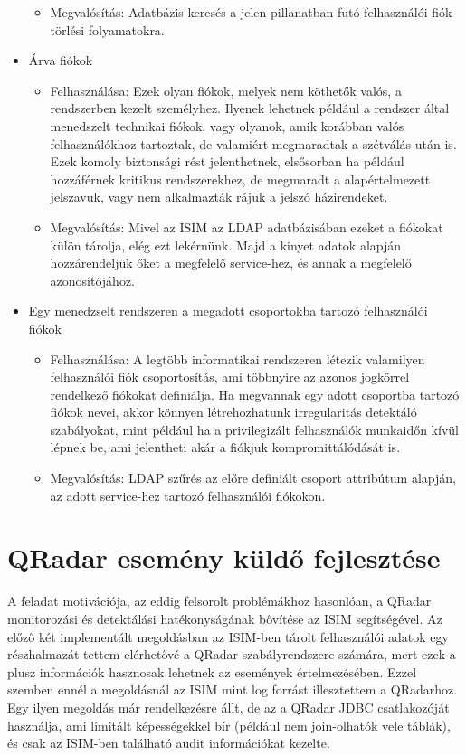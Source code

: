 \begin{itemize}
\begin{itemize}
		\item Megvalósítás:  Adatbázis keresés a jelen pillanatban futó felhasználói fiók törlési folyamatokra.
	\end{itemize}
	\item Árva fiókok
	\begin{itemize}
		\small
		\item Felhasználása: Ezek olyan fiókok, melyek nem köthetők valós, a rendszerben kezelt személyhez. Ilyenek lehetnek például a rendszer által menedszelt technikai fiókok, vagy olyanok, amik korábban valós felhasználókhoz tartoztak, de valamiért megmaradtak a szétválás után is. Ezek komoly biztonsági rést jelenthetnek, elsősorban ha például hozzáférnek kritikus rendszerekhez, de megmaradt a alapértelmezett jelszavuk, vagy nem alkalmazták rájuk a jelszó házirendeket.
		\item Megvalósítás: Mivel az ISIM az LDAP adatbázisában ezeket a fiókokat külön tárolja, elég ezt lekérnünk. Majd a kinyet adatok alapján hozzárendeljük őket a megfelelő service-hez, és annak a megfelelő azonosítójához.
	\end{itemize}
	\item Egy menedzselt rendszeren a megadott csoportokba tartozó felhasználói fiókok
	\begin{itemize}
		\small
		\item Felhasználása: A legtöbb informatikai rendszeren létezik valamilyen felhasználói fiók csoportosítás, ami többnyire az azonos jogkörrel rendelkező fiókokat definiálja. Ha megvannak egy adott csoportba tartozó fiókok nevei, akkor könnyen létrehozhatunk irregularitás detektáló szabályokat, mint például ha a privilegizált felhasználók munkaidőn kívül lépnek be, ami jelentheti akár a fiókjuk kompromittálódását is.
		\item Megvalósítás: LDAP szűrés az előre definiált csoport attribútum alapján, az adott service-hez tartozó felhasználói fiókokon.
	\end{itemize}
	
\end{itemize}
\section{QRadar esemény küldő fejlesztése}
A feladat motivációja, az eddig felsorolt problémákhoz hasonlóan, a QRadar monitorozási és detektálási hatékonyságának bővítése az ISIM segítségével. Az előző két implementált megoldásban az ISIM-ben tárolt felhasználói adatok egy részhalmazát tettem elérhetővé a QRadar szabályrendszere számára, mert ezek a plusz információk hasznosak lehetnek az események értelmezésében. Ezzel szemben ennél a megoldásnál az ISIM mint log forrást illesztettem a QRadarhoz. Egy ilyen megoldás már rendelkezésre állt, de az a QRadar JDBC csatlakozóját használja, ami limitált képességekkel bír (például nem join-olhatók vele táblák), és csak az ISIM-ben található audit információkat kezelte.

